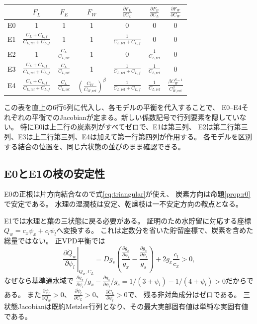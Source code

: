 \documentclass[a4paper,11pt]{ltjsarticle}
\begin{document}
\begin{landscape}
\begin{center}
\begin{tabular}{lcccccc}
\toprule
&$F_L$&$F_E$&$F_W$&
$\frac{\partial F_L}{\partial C_L}$&
$\frac{\partial F_E}{\partial C_L}$&
$\frac{\partial F_W}{\partial C_W}$\\\midrule
E0&1&1&1&0&0&0\\
E1&$\frac{C_L+C_{L,f}}{C_{L,\mathrm{ref}}+C_{L,f}}$&1&1&
$\frac{1}{C_{L,\mathrm{ref}}+C_{L,f}}$&0&0\\
E2&1&$\frac{C_L}{C_{L,\mathrm{ref}}}$&1&0&
$\frac{1}{C_{L,\mathrm{ref}}}$&0\\
E3&$\frac{C_L+C_{L,f}}{C_{L,\mathrm{ref}}+C_{L,f}}$&
$\frac{C_L}{C_{L,\mathrm{ref}}}$&1&
$\frac{1}{C_{L,\mathrm{ref}}+C_{L,f}}$&$\frac{1}{C_{L,\mathrm{ref}}}$&0\\
E4&$\frac{C_L+C_{L,f}}{C_{L,\mathrm{ref}}+C_{L,f}}$&
$\frac{C_L}{C_{L,\mathrm{ref}}}$&
$\left(\frac{C_W}{C_{W,\mathrm{ref}}}\right)^\beta$&
$\frac{1}{C_{L,\mathrm{ref}}+C_{L,f}}$&$\frac{1}{C_{L,\mathrm{ref}}}$&
$\frac{\beta C_W^{\beta-1}}{C_{W,\mathrm{ref}}^\beta}$\\
\bottomrule
\end{tabular}
\end{center}
\noindent
この表を直上の6行6列に代入し、各モデルの平衡を代入することで、
E0--E4それぞれの平衡でのJacobianが定まる。新しい係数記号で行列要素を隠していない。
特にE0は上二行の炭素列がすべてゼロで、E1は第三列、
E2は第二行第三列、E3は上二行第三列、E4は加えて第一行第四列が作用する。
各モデルを区別する結合の位置を、同じ六状態の並びのまま確認できる。
\end{landscape}

\subsection{E0とE1の枝の安定性}
E0の正根は片方向結合なので式\eqref{eq:triangular}が使え、
炭素方向は命題\ref{prop:r0}で安定である。
水理の湿潤枝は安定、乾燥枝は一不安定方向の鞍点となる。

E1では水理と葉の三状態に戻る必要がある。
証明のため水貯留に対応する座標$Q_w=c_x\psi_x+c_l\psi_l$へ変換する。
これは定数分を省いた貯留座標で、炭素を含めた総量ではない。
正VPD平衡では
\begin{equation}
 \left.\frac{\partial\dot Q_w}{\partial \psi_l}\right|_{Q_w,C_L}
 =Dg_s\left(\frac{\frac{\partial g_x}{\partial\psi_l}}{g_x}-\frac{\frac{\partial g_s}{\partial\psi_l}}{g_s}\right)+2g_x\frac{c_l}{c_x}>0 ,
\end{equation}
なぜなら基準通水域で
$\frac{\partial g_x}{\partial\psi_l}/g_x-\frac{\partial g_s}{\partial\psi_l}/g_s=1/(3+\psi_l)-1/(4+\psi_l)>0$だからである。
また$\frac{\partial\dot \psi_l}{\partial Q_w}>0$、
$\frac{\partial\dot\psi_l}{\partial C_L}>0$、
$\frac{\partial\dot C_L}{\partial \psi_l}>0$で、
残る非対角成分はゼロである。
三状態Jacobianは既約Metzler行列となり、その最大実部固有値は単純な実固有値である。
\end{document}
